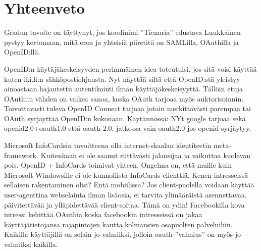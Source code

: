 \documentclass[finnish,gradu]{tktltiki}
\begin{document}

\section{Yhteenveto} %
\label{sec:yhteenveto}

    Gradun tavoite on täyttynyt, jos koodinimi ''Tienaria'' edustava Luukkainen pystyy kertomaan, mitä eroa ja yhteisiä piiretitä on SAMLilla, OAuthilla ja OpenID:llä.

    OpenID:n käytäjäkeskeisyyden perimmäinen idea toteutuisi, jos sitä voisi käyttää kuten iki.fi:n sähköpostiohjausta. Nyt näyttää siltä että OpenID:stä yleistyy ainoastaan hajautettu autentikointi ilman käyttäjäkeskeisyyttä. Tällöin etuja OAuthiin vähden on vaikea sanoa, koska OAuth tarjoaa myös auktorisoinnin. Toivottavasti tuleva OpenID Connect tarjoaa jotain merkittävästi parempaa tai OAuth syrjäyttää OpenID:n kokonaan. Käytännössä: NYt google tarjoaa sekä openid2.0+oauth1.0 että oauth 2.0, jatkossa vain oauth2.0 jos openid syrjäytyy.

 Microsoft InfoCardsin tavoitteena olla internet-skaalan identiteetin meta-framework. Kuitenkaan ei ole saanut riittävästi jalansijaa ja vaikuttaa kuolevan pois. OpenID + InfoCards toimivat yhteen. Ongelma on, että muille kuin Microsoft Windowsille ei ole kunnollista InfoCards-clienttiä. Kenen intresseissä sellaisen rakentaminen olisi? Entä mobiilissa? Jos client-puolella voidaan käyttää user-agenttina webselainta ilman lisäosia, ei tarvita ylimääräistä asennettavaa, päivitettävää ja ylläpidettävää client-softaa. Tämä on ydin! Facebookilla kova intressi kehittää OAuthia koska facebookin intresseissä on jakaa käyttäjätietojansa rajapintojen kautta kolmansien osapuolten palveluihin. Kaikilla käyttäjillä on selain jo valmiiksi, jolloin oauth-''valmius'' on myös jo valmiiksi kaikilla.






\lastpage
\end{document}
